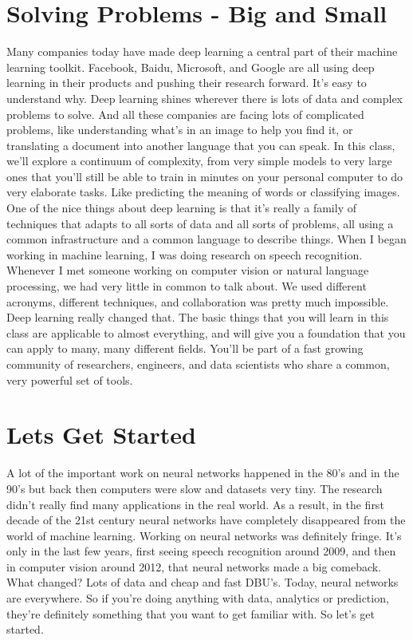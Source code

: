 \documentclass{article}
\begin{document}
\section{Solving Problems - Big and Small}
Many companies today have made deep
learning a central part of their
machine learning toolkit.
Facebook, Baidu, Microsoft, and Google
are all using deep learning in their
products and
pushing their research forward.
It's easy to understand why.
Deep learning shines wherever
there is lots of data and
complex problems to solve.
And all these companies are facing
lots of complicated problems,
like understanding what's in
an image to help you find it, or
translating a document into another
language that you can speak.
In this class,
we'll explore a continuum of complexity,
from very simple models to very large
ones that you'll still be able to train
in minutes on your personal computer
to do very elaborate tasks.
Like predicting the meaning of words or
classifying images.
One of the nice things about deep
learning is that it's really a family of
techniques that adapts to all sorts
of data and all sorts of problems,
all using a common infrastructure and
a common language to describe things.
When I began working
in machine learning,
I was doing research
on speech recognition.
Whenever I met someone
working on computer vision or
natural language processing, we had
very little in common to talk about.
We used different acronyms,
different techniques, and
collaboration was
pretty much impossible.
Deep learning really changed that.
The basic things that you will learn
in this class are applicable to
almost everything, and will give you
a foundation that you can apply to many,
many different fields.
You'll be part of a fast growing
community of researchers, engineers, and
data scientists who share a common,
very powerful set of tools.
\section{Lets Get Started}
A lot of the important work on neural
networks happened in the 80's and
in the 90's but back then computers
were slow and datasets very tiny.
The research didn't really find many
applications in the real world.
As a result, in the first decade of
the 21st century neural networks have
completely disappeared from
the world of machine learning.
Working on neural networks
was definitely fringe.
It's only in the last few years, first
seeing speech recognition around 2009,
and then in computer vision around 2012,
that neural networks
made a big comeback.
What changed?
Lots of data and cheap and fast DBU's.
Today, neural networks are everywhere.
So if you're doing anything with data,
analytics or
prediction, they're definitely something
that you want to get familiar with.
So let's get started.
\end{document}
